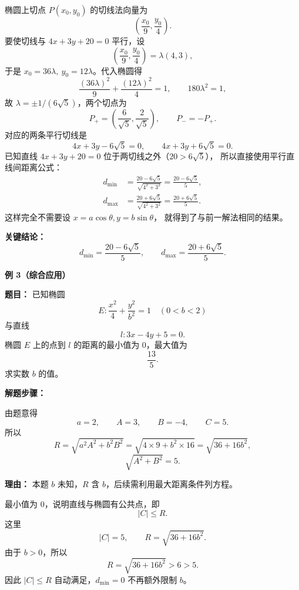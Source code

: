 \begin{examplebox}
	椭圆上切点 \(P(x_0,y_0)\) 的切线法向量为
	\[
		\left(\frac{x_0}{9},\frac{y_0}{4}\right).
	\]
	要使切线与 \(4x+3y+20=0\) 平行，设
	\[
		\left(\frac{x_0}{9},\frac{y_0}{4}\right)=\lambda(4,3),
	\]
	于是 \(x_0=36\lambda,\ y_0=12\lambda\)。代入椭圆得
	\[
		\frac{(36\lambda)^2}{9}+\frac{(12\lambda)^2}{4}=1,
		\qquad180\lambda^2=1,
	\]
	故 \(\lambda=\pm1/(6\sqrt5)\)，两个切点为
	\[
		P_+=\left(\frac6{\sqrt5},\frac2{\sqrt5}\right),
		\qquad P_-=-P_+.
	\]
	对应的两条平行切线是
	\[
		4x+3y-6\sqrt5=0,\qquad
		4x+3y+6\sqrt5=0.
	\]
	已知直线 \(4x+3y+20=0\) 位于两切线之外（\(20>6\sqrt5\)），
	所以直接使用平行直线间距离公式：
	\[
	\begin{aligned}
		d_{\min}&=\frac{20-6\sqrt5}{\sqrt{4^2+3^2}}=\frac{20-6\sqrt5}{5},\\
		d_{\max}&=\frac{20+6\sqrt5}{\sqrt{4^2+3^2}}=\frac{20+6\sqrt5}{5}.
	\end{aligned}
	\]
	这样完全不需要设 \(x=a\cos\theta,y=b\sin\theta\)，
	就得到了与前一解法相同的结果。

	\textbf{\textcolor{CExample}{关键结论：}}
	\[
		d_{\min}=\frac{20-6\sqrt5}{5},
		\qquad
		d_{\max}=\frac{20+6\sqrt5}{5}.
	\]

	\medskip

	\textbf{\textcolor{CExample}{例 3（综合应用）}}

	\textbf{\textcolor{CExample}{题目：}}
	已知椭圆
	\[
		E:\frac{x^2}{4}+\frac{y^2}{b^2}=1\quad (0<b<2)
	\]
	与直线
	\[
		l:3x-4y+5=0.
	\]
	椭圆 \(E\) 上的点到 \(l\) 的距离的最小值为 \(0\)，最大值为
	\[
		\frac{13}{5}.
	\]
	求实数 \(b\) 的值。

	\textbf{\textcolor{CExample}{解题步骤：}}

	\begin{description}[style=nextline, leftmargin=2.8em, labelsep=0.5em, itemsep=0.45em]
		\item[\textbf{第一步（写出 \(R\) 表达式）：}]
		      由题意得
		      \[
			      a=2,
			      \qquad
			      A=3,\qquad B=-4,\qquad C=5.
		      \]
		      所以
		      \[
			      R=\sqrt{a^2A^2+b^2B^2}
			      =
			      \sqrt{4\times 9+b^2\times 16}
			      =
			      \sqrt{36+16b^2},
		      \]
		      \[
			      \sqrt{A^2+B^2}=5.
		      \]

		      \par\textbf{理由：}
		      本题 \(b\) 未知，\(R\) 含 \(b\)，后续需利用最大距离条件列方程。

		\item[\textbf{第二步（利用 \(d_{\min}=0\) 检查位置关系）：}]
		      最小值为 \(0\)，说明直线与椭圆有公共点，即
		      \[
			      |C|\le R.
		      \]
		      这里
		      \[
			      |C|=5,
			      \qquad
			      R=\sqrt{36+16b^2}.
		      \]
		      由于 \(b>0\)，所以
		      \[
			      R=\sqrt{36+16b^2}>6>5.
		      \]
		      因此 \(|C|\le R\) 自动满足，\(d_{\min}=0\) 不再额外限制 \(b\)。


\end{description}
\end{examplebox}
